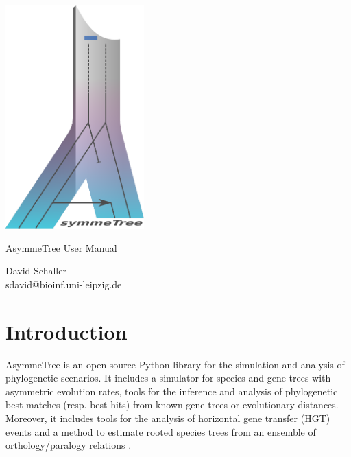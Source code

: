 \documentclass[hidelinks,11pt]{article}
\begin{document}
\begin{titlepage}
	\begin{center}
		\includegraphics[width=0.4\textwidth]{logo.pdf}
	\end{center}
	\begin{center}
		\vspace*{2cm}

		\Huge{
			AsymmeTree User Manual
		}

		\vspace{1.5cm}

		\LARGE
		David Schaller\\
		\vspace{1cm}
		\large
		sdavid@bioinf.uni-leipzig.de

		\vspace{2cm}

	\end{center}
\end{titlepage}

\newpage

\tableofcontents
\newpage

\section{Introduction}

AsymmeTree is an open-source Python library for the simulation and analysis of phylogenetic scenarios.
It includes a simulator for species and gene trees with asymmetric evolution 
rates, tools for the inference and analysis of phylogenetic best matches 
\citep{geiss2019a,geiss2020c} (resp. best hits) from known gene trees or 
evolutionary distances. Moreover, it includes tools for the analysis of 
horizontal gene transfer (HGT) events and a method to estimate rooted species 
trees from an ensemble of orthology/paralogy relations \citep{hellmuth2015}.
\end{document}

